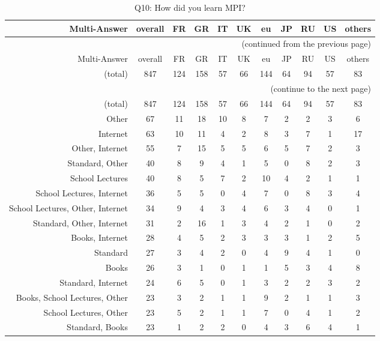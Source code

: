 \clearpage%
{\footnotesize\begin{landscape}%
\begin{longtable}[htb]{r|c|c|c|c|c|c|c|c|c|c}%
\caption{Q10: How did you learn MPI?}%
\label{tab:Q10-mans} \\%
\hline%
Multi-Answer & overall & FR & GR & IT & UK & eu & JP & RU & US & others \\
 \hline%
\endfirsthead%
\multicolumn{11}{r}{(continued from the previous page)}\\%
\hline%
Multi-Answer & overall & FR & GR & IT & UK & eu & JP & RU & US & others \\
 \hline%
\endhead%
\hline%
(total) & 847 & 124 & 158 & 57 & 66 & 144 & 64 & 94 & 57 & 83 \\%
\hline%
\multicolumn{11}{r}{(continue to the next page)}\\%
\endfoot%
\hline%
(total) & 847 & 124 & 158 & 57 & 66 & 144 & 64 & 94 & 57 & 83 \\%
\hline%
\endlastfoot%
\hline%
{Other} & 67 & 11 & 18 & 10 & 8 & 7 & 2 & 2 & 3 & 6 \\%
{Internet} & 63 & 10 & 11 & 4 & 2 & 8 & 3 & 7 & 1 & 17 \\%
{Other, Internet} & 55 & 7 & 15 & 5 & 5 & 6 & 5 & 7 & 2 & 3 \\%
{Standard, Other} & 40 & 8 & 9 & 4 & 1 & 5 & 0 & 8 & 2 & 3 \\%
{School Lectures} & 40 & 8 & 5 & 7 & 2 & 10 & 4 & 2 & 1 & 1 \\%
{School Lectures, Internet} & 36 & 5 & 5 & 0 & 4 & 7 & 0 & 8 & 3 & 4 \\%
{School Lectures, Other, Internet} & 34 & 9 & 4 & 3 & 4 & 6 & 3 & 4 & 0 & 1 \\%
{Standard, Other, Internet} & 31 & 2 & 16 & 1 & 3 & 4 & 2 & 1 & 0 & 2 \\%
{Books, Internet} & 28 & 4 & 5 & 2 & 3 & 3 & 3 & 1 & 2 & 5 \\%
{Standard} & 27 & 3 & 4 & 2 & 0 & 4 & 9 & 4 & 1 & 0 \\%
{Books} & 26 & 3 & 1 & 0 & 1 & 1 & 5 & 3 & 4 & 8 \\%
{Standard, Internet} & 24 & 6 & 5 & 0 & 1 & 3 & 2 & 2 & 3 & 2 \\%
{Books, School Lectures, Other} & 23 & 3 & 2 & 1 & 1 & 9 & 2 & 1 & 1 & 3 \\%
{School Lectures, Other} & 23 & 5 & 2 & 1 & 1 & 7 & 0 & 4 & 1 & 2 \\%
{Standard, Books} & 23 & 1 & 2 & 2 & 0 & 4 & 3 & 6 & 4 & 1 \\%

\end{longtable}
\end{landscape}}
